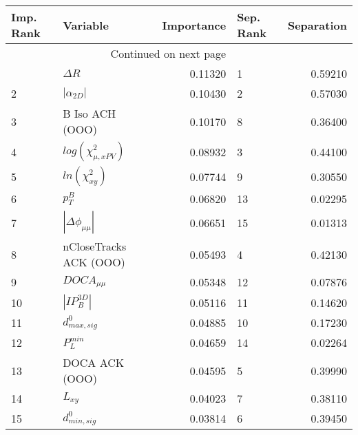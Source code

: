 \usepackage{lscape}

\begin{landscape}
\begin{longtable}{llrlr}
\toprule
Imp. Rank &                   Variable &  Importance & Sep. Rank &  Separation \\
\midrule
\endhead
\midrule
\multicolumn{3}{r}{{Continued on next page}} \\
\midrule
\endfoot

\bottomrule
\endlastfoot
        1 &                 $\Delta R$ &     0.11320 &         1 &     0.59210 \\
        2 &            $|\alpha_{2D}|$ &     0.10430 &         2 &     0.57030 \\
        3 &            B Iso ACH (OOO) &     0.10170 &         8 &     0.36400 \\
        4 &  $log(\chi^{2}_{\mu,xPV})$ &     0.08932 &         3 &     0.44100 \\
        5 &        $ln(\chi^{2}_{xy})$ &     0.07744 &         9 &     0.30550 \\
        6 &                  $p^B_{T}$ &     0.06820 &        13 &     0.02295 \\
        7 &   $|\Delta \phi_{\mu\mu}|$ &     0.06651 &        15 &     0.01313 \\
        8 &     nCloseTracks ACK (OOO) &     0.05493 &         4 &     0.42130 \\
        9 &            $DOCA_{\mu\mu}$ &     0.05348 &        12 &     0.07876 \\
       10 &            $|IP_{B}^{3D}|$ &     0.05116 &        11 &     0.14620 \\
       11 &           $d^0_{max, sig}$ &     0.04885 &        10 &     0.17230 \\
       12 &              $P^{min}_{L}$ &     0.04659 &        14 &     0.02264 \\
       13 &             DOCA ACK (OOO) &     0.04595 &         5 &     0.39990 \\
       14 &                   $L_{xy}$ &     0.04023 &         7 &     0.38110 \\
       15 &           $d^0_{min, sig}$ &     0.03814 &         6 &     0.39450 \\
\end{longtable}

\end{landscape}
